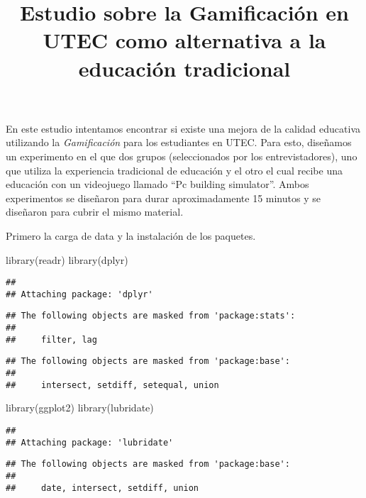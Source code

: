 \documentclass[
]{article}
\title{Estudio sobre la Gamificación en UTEC como alternativa a la
educación tradicional}
\author{}
\date{\vspace{-2.5em}}
\newenvironment{Shaded}{\begin{snugshade}}{\end{snugshade}}
\newcommand{\FunctionTok}[1]{\textcolor[rgb]{0.00,0.00,0.00}{#1}}
\newcommand{\NormalTok}[1]{#1}
\begin{document}
\maketitle

En este estudio intentamos encontrar si existe una mejora de la calidad
educativa utilizando la \emph{Gamificación} para los estudiantes en
UTEC. Para esto, diseñamos un experimento en el que dos grupos
(seleccionados por los entrevistadores), uno que utiliza la experiencia
tradicional de educación y el otro el cual recibe una educación con un
videojuego llamado ``Pc building simulator''. Ambos experimentos se
diseñaron para durar aproximadamente 15 minutos y se diseñaron para
cubrir el mismo material.

Primero la carga de data y la instalación de los paquetes.

\begin{Shaded}
\begin{Highlighting}[]
\FunctionTok{library}\NormalTok{(readr)}
\FunctionTok{library}\NormalTok{(dplyr)}
\end{Highlighting}
\end{Shaded}

\begin{verbatim}
## 
## Attaching package: 'dplyr'
\end{verbatim}

\begin{verbatim}
## The following objects are masked from 'package:stats':
## 
##     filter, lag
\end{verbatim}

\begin{verbatim}
## The following objects are masked from 'package:base':
## 
##     intersect, setdiff, setequal, union
\end{verbatim}

\begin{Shaded}
\begin{Highlighting}[]
\FunctionTok{library}\NormalTok{(ggplot2)}
\FunctionTok{library}\NormalTok{(lubridate)}
\end{Highlighting}
\end{Shaded}

\begin{verbatim}
## 
## Attaching package: 'lubridate'
\end{verbatim}

\begin{verbatim}
## The following objects are masked from 'package:base':
## 
##     date, intersect, setdiff, union
\end{verbatim}
\end{document}
